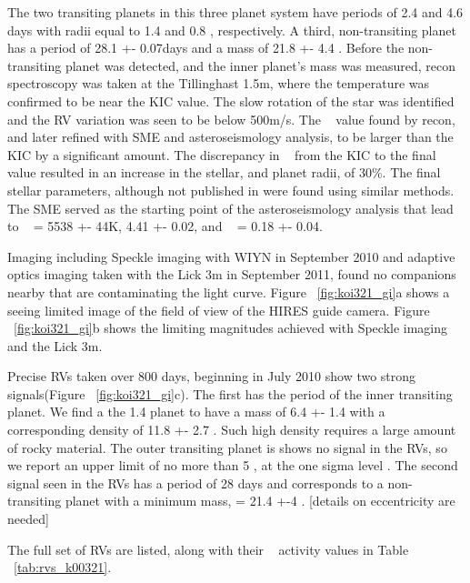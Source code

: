 \documentclass{emulateapj}
\begin{document}
The two transiting planets in this three planet system have periods of 2.4 and 4.6 days with radii equal to 1.4 and 0.8 \rearthe, respectively. A third, non-transiting planet has a period of 28.1 +- 0.07days and a mass of 21.8 +- 4.4 \mearthe. Before the non-transiting planet was detected, and the inner planet's mass was measured, recon spectroscopy was taken at  the Tillinghast 1.5m, where the temperature was confirmed to be near the KIC value. The slow rotation of the star was identified and the RV variation was seen to be below 500m/s.  The \logg~ value found by recon, and later refined with SME and asteroseismology analysis, to be larger than the KIC by a significant amount. The discrepancy in \logg~ from the KIC to the final value resulted in an increase in the stellar, and planet radii, of 30\%. The final stellar parameters, although not published in \citep{Huber2013} were found using similar methods. The SME served as the starting point of the asteroseismology analysis that lead to \teff~ = 5538 +- 44K, 4.41 +- 0.02, and \feh~ = 0.18 +- 0.04.

Imaging including Speckle imaging with WIYN in September 2010 and adaptive optics imaging taken with the Lick 3m in September 2011, found no companions nearby that are contaminating the light curve. Figure ~\ref{fig:koi321_gi}a shows a seeing limited image of the field of view of the HIRES guide camera.  Figure ~\ref{fig:koi321_gi}b shows the limiting magnitudes achieved with Speckle imaging and the Lick 3m. 

 
 Precise RVs taken over 800 days, beginning in July 2010 show two strong signals(Figure ~\ref{fig:koi321_gi}c). The first has the period of the inner transiting planet. We find a the 1.4 \rearth planet to have a mass of 6.4 +- 1.4 \mearth with a corresponding density of 11.8 +- 2.7 \gcc. Such high density requires a large amount of rocky material. The outer transiting planet is shows no signal in the RVs, so we report an upper limit of no more than 5 \mearth, at the one sigma level . The second signal seen in the RVs has a period of 28 days and corresponds to a non-transiting planet with a minimum mass, \msini = 21.4 +-4 \mearthe. [details on eccentricity are needed]

The full set of RVs are listed, along with their \rphk~ activity values in Table ~\ref{tab:rvs_k00321}.



\subsection{\koionefourfourtwo} %
\end{document}
